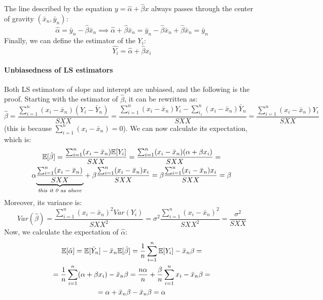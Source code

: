 The line described by the equation $y = \hat{\alpha} + \hat{\beta}x$ always passes through the center of gravity $(\bar{x}_n, \bar{y}_n)$:
\begin{equation*}
    \hat{\alpha} = \bar{y}_n - \hat{\beta} \bar{x}_n \implies \hat{\alpha} + \hat{\beta} \bar{x}_n = \bar{y}_n - \hat{\beta} \bar{x}_n + \hat{\beta} \bar{x}_n = \bar{y}_n
\end{equation*}   
Finally, we can define the estimator of the $Y_i$:
\begin{equation*}
    \hat{Y_i} = \hat{\alpha} + \hat{\beta} x_i
\end{equation*}   

\paragraph{Unbiasedness of LS estimators}
Both LS estimators of slope and interept are unbiased, and the following is the proof. Starting with the estimator of $\hat{\beta}$, it can be rewritten as:
\begin{equation*}
    \hat{\beta} = \frac{\sum_{i=1}^n (x_i - \bar{x}_n) (Y_i - \bar{Y}_n)}{SXX} = \frac{\sum_{i=1}^n (x_i - \bar{x}_n) Y_i - \sum_{i_1}^n (x_i - \bar{x}_n) \bar{Y}_n}{SXX} = \frac{\sum_{i=1}^n (x_i - \bar{x}_n) Y_i}{SXX}
\end{equation*}   
(this is because $\sum_{i=1}^n (x_i - \bar{x}_n) = 0$). We can now calculate its expectation, which is:
\begin{gather*}
    \mathbb{E}[\hat{\beta}] = \frac{\sum_{i=1}^n (x_i - \bar{x}_n) \mathbb{E}[Y_i]}{SXX} = \frac{\sum_{i=1}^n (x_i - \bar{x}_n) (\alpha + \beta x_i)}{SXX} = \\
    \alpha \underset{\textit{this it 0 as above}}{\underbrace{\frac{\sum_{i=1}^n (x_i - \bar{x}_n)}{SXX}}} + \beta \frac{\sum_{i=1}^n (x_i - \bar{x}_n) x_i}{SXX} = \beta \frac{\sum_{i=1}^n (x_i - \bar{x}_n) x_i}{SXX} = \beta
\end{gather*}
Moreover, its variance is:
\begin{equation*}
    Var(\hat{\beta}) = \frac{\sum_{i=1}^n (x_i - \bar{x}_n)^2 Var(Y_i)}{SXX^2} = \sigma^2 \frac{\sum_{i=1}^n (x_i - \bar{x}_n)^2}{SXX^2} = \frac{\sigma^2}{SXX}
\end{equation*}   
Now, we calculate the expectation of $\hat{\alpha}$:
\begin{gather*}
    \mathbb{E}[\hat{\alpha}] = \mathbb{E}[\bar{Y}_n] - \bar{x}_n \mathbb{E}[\hat{\beta}] = \frac{1}{n} \sum_{i=1}^n \mathbb{E}[Y_i] - \bar{x}_n \beta = \\
    = \frac{1}{n} \sum_{i=1}^n (\alpha + \beta x_i) - \bar{x}_n \beta = \frac{n \alpha}{n} + \frac{\beta}{n} \sum_{i=1}^n x_i - \bar{x}_n \beta = \\
    = \alpha + \bar{x}_n \beta - \bar{x}_n \beta = \alpha 
\end{gather*}
